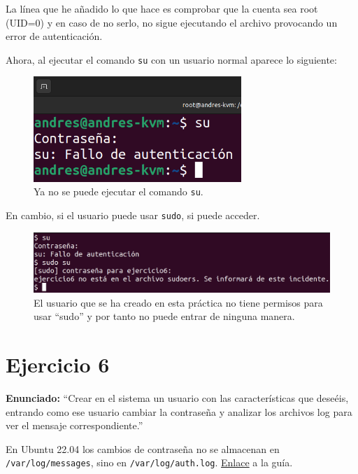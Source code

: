 \documentclass{article}
\begin{document}
La línea que he añadido lo que hace es comprobar que la cuenta sea root (UID=0) y en caso de no serlo, no sigue ejecutando el archivo provocando un error de autenticación.

\bigskip

Ahora, al ejecutar el comando \verb|su| con un usuario normal aparece lo siguiente:

\begin{figure}[H]
    \centering
    \includegraphics[width=0.7\textwidth]{imagenes/sudenyuser.png}
    \caption{Ya no se puede ejecutar el comando \texttt{su}.}
\end{figure}

\newpage

En cambio, si el usuario puede usar \verb|sudo|, si puede acceder.

\begin{figure}[H]
    \centering
    \includegraphics[width=\textwidth]{imagenes/sudenyuserprueba.png}
    \caption{El usuario que se ha creado en esta práctica no tiene permisos para usar ``sudo'' y por tanto no puede entrar de ninguna manera.}
\end{figure}



\section{Ejercicio 6}

\textbf{Enunciado: }``Crear en el sistema un usuario con las características que deseéis, entrando como ese usuario cambiar la contraseña y analizar los archivos log para ver el mensaje correspondiente.''

\bigskip

En Ubuntu 22.04 los cambios de contraseña no se almacenan en \verb|/var/log/messages|, sino en \verb|/var/log/auth.log|. \href{https://ubuntu.com/tutorials/viewing-and-monitoring-log-files#2-log-files-locations}{Enlace} a la guía.
\end{document}

